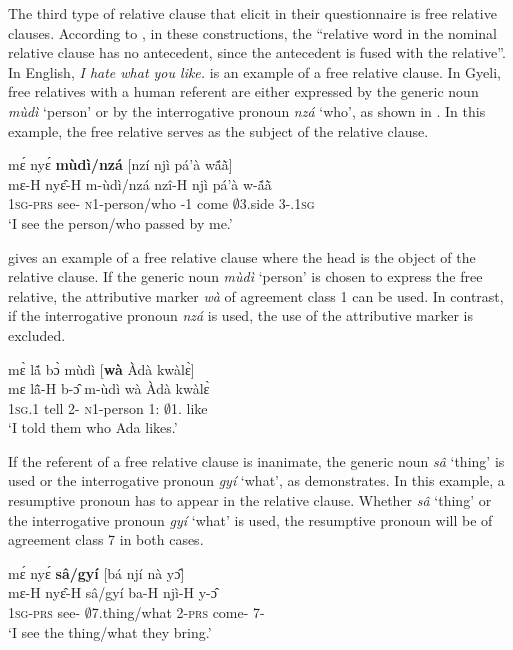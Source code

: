 The third type of relative clause that \citet{downing2010} elicit in their questionnaire is free relative clauses. According to \citet{mcarthur2005}, in these constructions, the
``relative word in the nominal relative clause has no antecedent, since the antecedent is fused with the relative''. In English, {\itshape I hate what you like.} is an example of a free relative clause. In Gyeli, free relatives with a human referent are either expressed by the generic noun {\itshape mùdì} `person' or by the interrogative pronoun {\itshape nzá} `who', as shown in . In this example, the free relative serves as the subject of the relative clause.


\ea\label{FREL1}
  \glll mɛ́ nyɛ́ {\bfseries mùdì/nzá} [nzí njì pá'à wã́ã̀]\textsubscript{{\REL}}\\
         mɛ-H nyɛ̂-H m-ùdì/nzá {\db}nzî-H njì pá'à w-ã́ã̀ \\
         1\textsc{sg}-\textsc{prs} see-{\R} \textsc{n}1-person/who {\db}{\PROG}-{\PST}1 come $\emptyset$3.side 3-{\POSS}.1\textsc{sg}   \\
    \trans `I see the person/who passed by me.'
\z

 gives an example of a free relative clause where the head is the object of the relative clause. If the generic noun {\itshape mùdì} `person' is chosen to express the free relative, the attributive marker {\itshape wà} of agreement class 1 can be used. In contrast, if the interrogative pronoun {\itshape nzá} is used, the use of the attributive marker is excluded.


\ea\label{FREL2}
  \glll mɛ̀ lã́ bɔ̀ mùdì [{\bfseries wà} Àdà kwàlɛ̀]\textsubscript{{\REL}} \\
         mɛ lã̂-H b-ɔ̂ m-ùdì {\db}wà Àdà kwàlɛ̀ \\
         1\textsc{sg}.{\PST}1 tell 2-{\OBJ} \textsc{n}1-person {\db}1:{\ATT} $\emptyset$1.{\PN} like   \\
    \trans `I told them who Ada likes.'
\z

If the referent of a free relative clause is inanimate, the generic noun {\itshape sâ} `thing' is used or the interrogative pronoun {\itshape gyí} `what', as  demonstrates. In this example, a resumptive pronoun has to appear in the relative clause. Whether {\itshape sâ} `thing' or the interrogative pronoun {\itshape gyí} `what' is used, the resumptive pronoun will be of agreement class 7 in both cases.


\ea\label{FREL1a}
  \glll mɛ́ nyɛ́ {\bfseries sâ/gyí} [bá njí nà yɔ̂]\textsubscript{{\REL}}\\
         mɛ-H nyɛ̂-H sâ/gyí {\db}ba-H njì-H {\COM} y-ɔ̂\\
         1\textsc{sg}-\textsc{prs} see-{\R} $\emptyset$7.thing/what {\db}2-\textsc{prs} come-{\R} {\COM} 7-{\OBJ}  \\
    \trans `I see the thing/what they bring.'
\z

